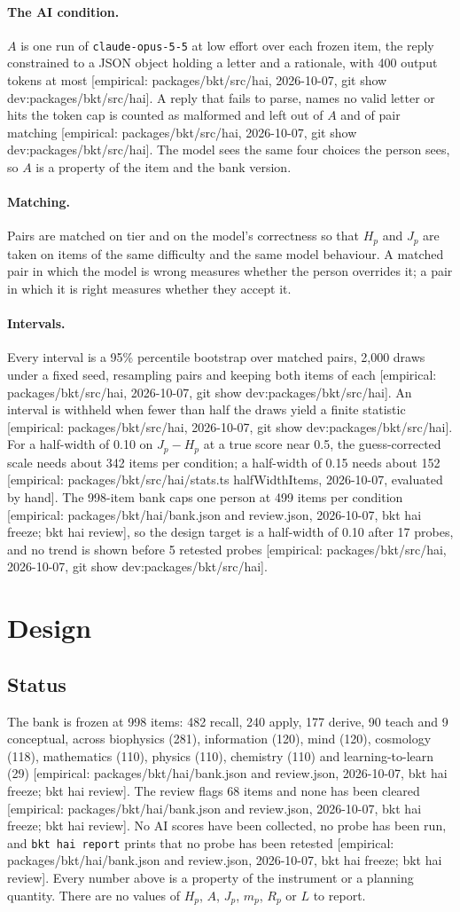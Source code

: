 \documentclass[11pt]{article}
\newcommand{\emp}[1]{\textcolor{bucketgray}{\footnotesize [empirical: #1]}}
\newcommand{\hai}{\emp{packages/bkt/src/hai, 2026-10-07, git show dev:packages/bkt/src/hai}}
\newcommand{\bank}{\emp{packages/bkt/hai/bank.json and review.json, 2026-10-07, bkt hai freeze; bkt hai review}}
\newcommand{\calc}{\emp{packages/bkt/src/hai/stats.ts halfWidthItems, 2026-10-07, evaluated by hand}}
\begin{document}
\paragraph{The AI condition.}
$A$ is one run of \texttt{claude-opus-5-5} at low effort over each frozen item, the reply constrained to a JSON object holding a letter and a rationale, with 400 output tokens at most \hai. A reply that fails to parse, names no valid letter or hits the token cap is counted as malformed and left out of $A$ and of pair matching \hai. The model sees the same four choices the person sees, so $A$ is a property of the item and the bank version.

\paragraph{Matching.}
Pairs are matched on tier and on the model's correctness so that $H_p$ and $J_p$ are taken on items of the same difficulty and the same model behaviour. A matched pair in which the model is wrong measures whether the person overrides it; a pair in which it is right measures whether they accept it.

\paragraph{Intervals.}
Every interval is a 95\% percentile bootstrap over matched pairs, 2,000 draws under a fixed seed, resampling pairs and keeping both items of each \hai. An interval is withheld when fewer than half the draws yield a finite statistic \hai. For a half-width of 0.10 on $J_p - H_p$ at a true score near 0.5, the guess-corrected scale needs about 342 items per condition; a half-width of 0.15 needs about 152 \calc. The 998-item bank caps one person at 499 items per condition \bank, so the design target is a half-width of 0.10 after 17 probes, and no trend is shown before 5 retested probes \hai.

\section{Design}
\label{sec:design}

\subsection{Status}
\label{sec:status}

The bank is frozen at 998 items: 482 recall, 240 apply, 177 derive, 90 teach and 9 conceptual, across biophysics (281), information (120), mind (120), cosmology (118), mathematics (110), physics (110), chemistry (110) and learning-to-learn (29) \bank. The review flags 68 items and none has been cleared \bank. No AI scores have been collected, no probe has been run, and \texttt{bkt hai report} prints that no probe has been retested \bank. Every number above is a property of the instrument or a planning quantity. There are no values of $H_p$, $A$, $J_p$, $m_p$, $R_p$ or $L$ to report.
\end{document}
